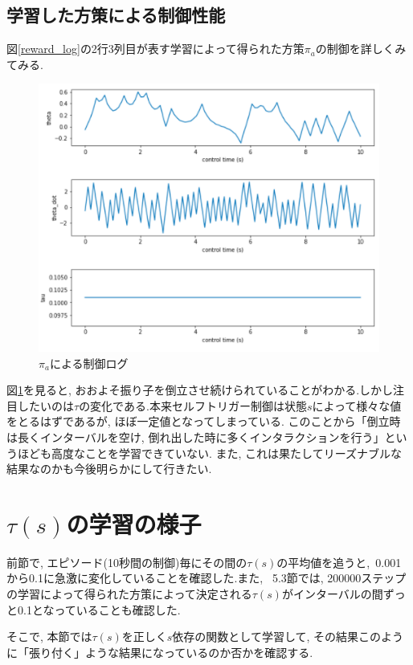 \documentclass{jsarticle}
\begin{document}
\subsection{学習した方策による制御性能}
図\ref{reward_log}の2行3列目が表す学習によって得られた方策$\pi_a$の制御を詳しくみてみる. \par
\begin{figure}[h]
	\centering
 	\includegraphics[width=14cm]{control_log.png}
 	\caption{$\pi_a$による制御ログ} \label{control_log}
\end{figure}
図\ref{control_log}を見ると, おおよそ振り子を倒立させ続けられていることがわかる.しかし注目したいのは$\tau$の変化である.本来セルフトリガー制御は状態$s$によって様々な値をとるはずであるが, 
ほぼ一定値となってしまっている. このことから「倒立時は長くインターバルを空け, 倒れ出した時に多くインタラクションを行う」というほども高度なことを学習できていない. また, これは果たしてリーズナブルな結果なのかも今後明らかにして行きたい.

\section{$\tau(s)$の学習の様子}
前節で, エピソード(10秒間の制御)毎にその間の$\tau(s)$の平均値を追うと,~0.001から0.1に急激に変化していることを確認した.また, ~5.3節では, 200000ステップの学習によって得られた方策によって決定される$\tau(s)$がインターバルの間ずっと0.1となっていることも確認した. \par
そこで, 本節では$\tau(s)$を正しく$s$依存の関数として学習して, その結果このように「張り付く」ような結果になっているのか否かを確認する. 
\end{document}
